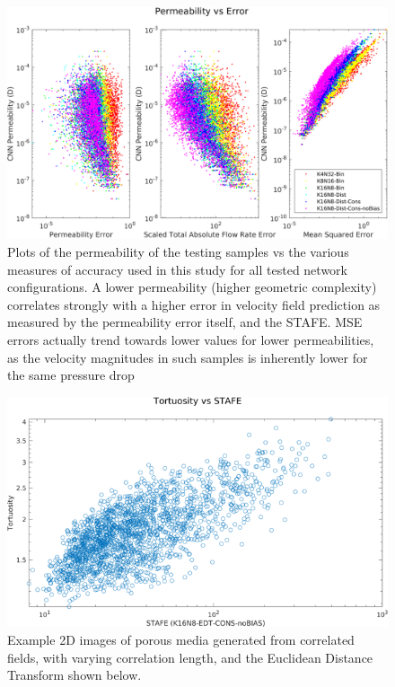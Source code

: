 \documentclass{article}
\begin{document}
\begin{figure}[htp!]
  \centering
    \includegraphics[width=\textwidth]{./figures/permVError.png}
    \caption{Plots of the permeability of the testing samples vs the various measures of accuracy used in this study for all tested network configurations. A lower permeability (higher geometric complexity) correlates strongly with a higher error in velocity field prediction as measured by the permeability error itself, and the STAFE. MSE errors actually trend towards lower values for lower permeabilities, as the velocity magnitudes in such samples is inherently lower for the same pressure drop}
    \label{fig:permError}
\end{figure}


\begin{figure}[htp!]
  \centering
     \begin{minipage}[b]{0.5\textwidth}
    \includegraphics[width=\textwidth]{./figures/tortVError.png}
    \end{minipage}
    \caption{Example 2D images of porous media generated from correlated fields, with varying correlation length, and the Euclidean Distance Transform shown below.}
    \label{fig:tortError}
\end{figure}
\end{document}
